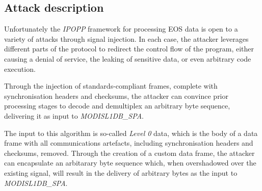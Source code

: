 





\subsection{Attack description}


Unfortunately the \textit{IPOPP} framework for processing EOS data is open to a variety of attacks through signal injection.
In each case, the attacker leverages different parts of the protocol to redirect the control flow of the program, either causing a denial of service, the leaking of sensitive data, or even arbitrary code execution.

Through the injection of standards-compliant frames, complete with synchronisation headers and checksums, the attacker can convince prior processing stages to decode and demultiplex an arbitrary byte sequence, delivering it as input to \textit{MODISL1DB\_SPA}.

The input to this algorithm is so-called \textit{Level 0} data, which is the body of a data frame with all communications artefacts, including synchronisation headers and checksums, removed.
Through the creation of a custom data frame, the attacker can encapsulate an arbitarary byte sequence which, when overshadowed over the existing signal, will result in the delivery of arbitrary bytes as the input to \textit{MODISL1DB\_SPA}.

